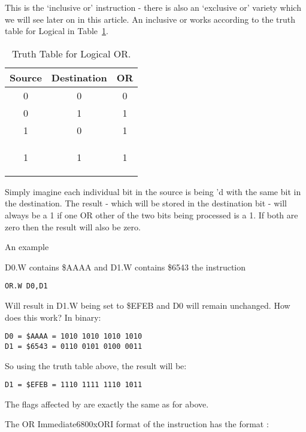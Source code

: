 This is the `inclusive or' instruction -{} there is also an `exclusive
    or' variety which we will see later on in this article. An inclusive or
    works according to the truth table for Logical  in Table~\ref{tab:TruthTableForLogicalOR}.


\begin{table}[h]
\centering
\begin{tabular}{cc|c}

Source & Destination & OR\\ \hline
0 & 0 & 0 \\
0 & 1 & 1 \\
1 & 0 & 1 \\
1 & 1 & 1

\label{tab:ORTruthTable}
\end{tabular}
\caption{Truth Table for Logical OR.}
\label{tab:TruthTableForLogicalOR}
\end{table}


Simply imagine each individual bit in the source is being 'd with
    the same bit in the destination. The result -{} which will be stored in the
    destination bit -{} will always be a 1 if one OR other of the two bits being
    processed is a 1. If both are zero then the result will also be
    zero.

An example

D0.W contains \$AAAA and D1.W contains \$6543 the instruction

\begin{lstlisting}[firstnumber=1,]
          OR.W D0,D1
\end{lstlisting}

Will result in D1.W being set to \$EFEB and D0 will remain unchanged.
    How does this work? In binary:

\begin{lstlisting}[firstnumber=1,frame=none,numbers=none]
D0 = $AAAA = 1010 1010 1010 1010
D1 = $6543 = 0110 0101 0100 0011
\end{lstlisting}

So using the truth table above, the result will be:

\begin{lstlisting}[firstnumber=1,frame=none,numbers=none]
D1 = $EFEB = 1110 1111 1110 1011
\end{lstlisting}

The flags affected by  are exactly the same as for 
    above.
    
The OR Immediate\mc6800x{ORI} format of the  instruction has the format
   :

